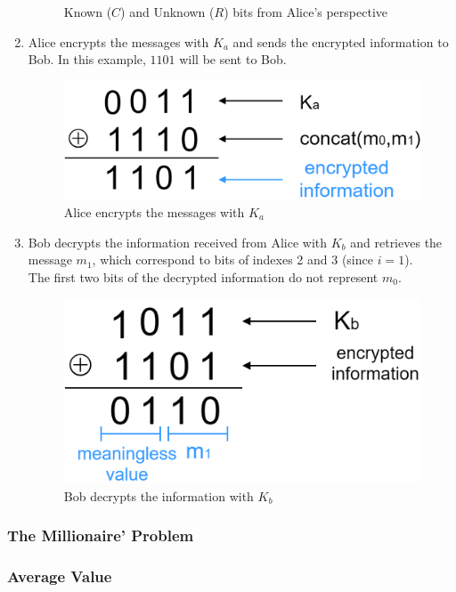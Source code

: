 \begin{enumerate}
\begin{figure}[H]
\caption{Known ($C$) and Unknown ($R$) bits from Alice's perspective }
\label{fig:knownalice}
\end{figure}
\item Alice encrypts the messages with $K_a$ and sends the encrypted information to Bob. In this example, $1101$ will be sent to Bob.
\renewcommand{\figurename}{Figure}
\begin{figure}[H]
\centering
\includegraphics[width=.4\linewidth]{./figures/mpc/mpc_message_encrypting}
\caption{Alice encrypts the messages with $K_a$}
\label{fig:mpcencryption}
\end{figure}
\item Bob decrypts the information received from Alice with $K_b$ and retrieves the message $m_1$, which correspond to bits of indexes 2 and 3 (since $i=1$).\\
The first two bits of the decrypted information do not represent $m_0$.
\renewcommand{\figurename}{Figure}
\begin{figure}[H]
\centering
\includegraphics[width=.4\linewidth]{./figures/mpc/mpc_message_decrypting}
\caption{Bob decrypts the information with $K_b$}
\label{fig:mpcdecryption}
\end{figure}
\end{enumerate}

\subsubsection{The Millionaire' Problem}
\subsubsection{Average Value}

